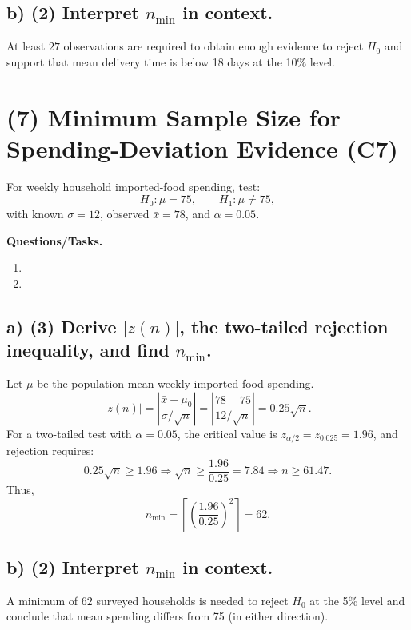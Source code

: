 
\subsection*{b) \textbf{(2)} Interpret \(n_{\min}\) in context.}
\label{subsec:delivery-time-minimum-sample-size-c7-b}
At least \(27\) observations are required to obtain enough evidence to reject \(H_0\) and support that mean delivery time is below 18 days at the 10\% level.


\section{(7) Minimum Sample Size for Spending-Deviation Evidence (C7)}
\label{sec:spending-two-tailed-minimum-sample-size-c7}
For weekly household imported-food spending, test:
\[
H_0:\mu=75,\qquad H_1:\mu\ne75,
\]
with known \(\sigma=12\), observed \(\bar x=78\), and \(\alpha=0.05\).

\textbf{Questions/Tasks.}
\begin{enumerate}[label=\textbf{\alph*)}]
    \item {}
    \item {}
\end{enumerate}

\subsection*{a) \textbf{(3)} Derive \(|z(n)|\), the two-tailed rejection inequality, and find \(n_{\min}\).}
\label{subsec:spending-two-tailed-minimum-sample-size-c7-a}
Let \(\mu\) be the population mean weekly imported-food spending.
\[
|z(n)|=\left|\frac{\bar x-\mu_0}{\sigma/\sqrt n}\right|=\left|\frac{78-75}{12/\sqrt n}\right|=0.25\sqrt n.
\]
For a two-tailed test with \(\alpha=0.05\), the critical value is \(z_{\alpha/2}=z_{0.025}=1.96\), and rejection requires:
\[
0.25\sqrt n\ge1.96
\Rightarrow
\sqrt n\ge\frac{1.96}{0.25}=7.84
\Rightarrow
n\ge61.47.
\]
Thus,
\[
n_{\min}=\left\lceil\left(\frac{1.96}{0.25}\right)^2\right\rceil=62.
\]


\subsection*{b) \textbf{(2)} Interpret \(n_{\min}\) in context.}
\label{subsec:spending-two-tailed-minimum-sample-size-c7-b}
A minimum of \(62\) surveyed households is needed to reject \(H_0\) at the 5\% level and conclude that mean spending differs from 75 (in either direction).



